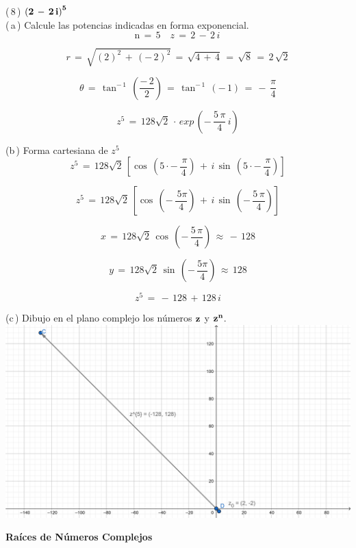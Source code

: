 \documentclass[a4paper,11pt,openany]{book}
\begin{document}
\textcolor{ao(english)}{(\,8\,)} $\bf{\left(2\,-\,2\,i\right)^{5}}$\\

\textcolor{ao(english)}{(\,a\,)} Calcule las potencias indicadas en forma exponencial.\\

$$\text{n}\,=\,5 \quad z\,=\,2\,-\,2\,i\,$$

$$r\,=\,\sqrt{(2)^{2}\,+\,(-\,2)^{2}}\,=\,\sqrt{4\,+\,4}\,=\,\sqrt{8}\,=\,2\,\sqrt{2}$$

$$\theta\,=\,\tan^{-\,1}\,\left(\dfrac{-\,2}{2}\right)\,=\,\tan^{-\,1}\,(-\,1)\,=\,-\,\dfrac{\pi}{4}$$

$$z^{5}\,=\,128\sqrt{2}\,\cdot\,exp\,\left(-\,\dfrac{5\,\pi}{4}\,i\right)$$

\textcolor{ao(english)}{(b\,)} Forma cartesiana de $z^{5}$\\

$$z^{5}\,=\,128\sqrt{2}\,\left[\cos\,\left(5 \cdot -\,\dfrac{\,\pi}{4}\right)\,+\,i\,\sin\,\left(5 \cdot-\,\dfrac{\,\pi}{4}\right)\right]$$

$$z^{5}\,=\,128\sqrt{2}\,\left[\cos\,\left(-\,\dfrac{\,5\pi}{4}\right)\,+\,i\,\sin\,\left(-\,\dfrac{5\,\pi}{4}\right)\right]$$

$$x\,=\,128\sqrt{2}\,\cos\,\left(-\,\dfrac{5\,\pi}{4}\right)\,\approx\,-\,128$$

$$y\,=\,128\sqrt{2}\,\sin\,\left(-\,\dfrac{5\pi}{4}\right)\,\approx\,128$$

$$z^{5}\,=\,-\,128\,+\,128\,i$$

\textcolor{ao(english)}{(c\,)} Dibujo en el plano complejo los números $\bf{z}$ y $\bf{z^{n}}$.\\

\includegraphics[width=15cm]{Gra-Ej-8}

\begin{center}
\textbf{Raíces de Números Complejos}
\end{center}
\end{document}
